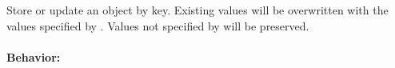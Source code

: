 Store or update an object by key.  Existing values will be overwritten with the
values specified by .  Values not specified by  will be
preserved.

\paragraph{Behavior:}
\begin{itemize}[noitemsep]

\end{itemize}
